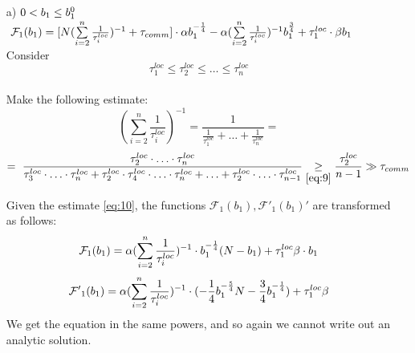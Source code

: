 \documentclass{article}
\begin{document}
\begin{itemize}
    \item [a)] $0 < b_1 \leq b_1^0\\$
    $~\mathcal{F}_1(b_1) = [N (\sum\limits_{i = 2}^{n} \frac{1}{\tau_i^{loc}})^{-1} + \tau_{comm}]\cdot 
    \alpha  b_1^{-\frac{1}{4}} - 
    \alpha(\sum\limits_{i =
    2}^{n} \frac{1}{\tau_i^{loc}})^{-1} b_1^{\frac{3}{4}}  + \tau_1^{loc}\cdot\beta b_1\\$
    Consider
    \begin{equation}
        \label{eq:9}
        \tau_1^{loc} \leq \tau_2^{loc} \leq\ldots \leq \tau_n^{loc}
    \end{equation}\\
    Make the following estimate:
    \begin{equation}
    \label{eq:10}
      (\sum\limits_{i = 2}^n \frac{1}{\tau_i^{loc}})^{-1} = \frac{1}{\frac{1}{\tau_1^{loc}} + \ldots + \frac{1}{\tau_n^{loc}}} = 
    \end{equation}
    \begin{equation}
         \notag
         = ~
        \frac{\tau_2^{loc}\cdot \ldots \cdot\tau_n^{loc}}{\tau_3^{loc}\cdot \ldots \cdot\tau_n^{loc} + \tau_2^{loc}\cdot \tau_4^{loc}\cdot\ldots \cdot\tau_n^{loc} + \ldots + \tau_2^{loc}\cdot \ldots \cdot\tau_{n-1}^{loc}} \underset{\eqref{eq:9}}{\geq}\frac{\tau_2^{loc}}{n - 1} \gg \tau_{comm}
    \end{equation}
   
    Given the estimate \eqref{eq:10}, the functions $\mathcal{F}_1(b_1), \mathcal{F'}_1(b_1)'$ are transformed as follows:
    \begin{eqnarray}
        \notag
        \begin{split}
            \mathcal{F}_1(b_1) = \alpha(\sum\limits_{i = 2}^n \frac{1}{\tau_i^{loc}})^{-1}\cdot b_1^{-\frac{1}{4}}(N - b_1) + \tau_1^{loc}\beta\cdot b_1
        \end{split}
    \end{eqnarray}
    \begin{equation}
    \notag
        \mathcal{F'}_1 (b_1) = \alpha(\sum\limits_{i = 2}^n \frac{1}{\tau_i^{loc}})^{-1}\cdot (-\frac{1}{4}b_1^{-\frac{5}{4}}N - \frac{3}{4}b_1^{-\frac{1}{4}}) + \tau_1^{loc}\beta
    \end{equation}
    We get the equation in the same powers, and so again we cannot write out an analytic solution.


\end{itemize}
\end{document}
